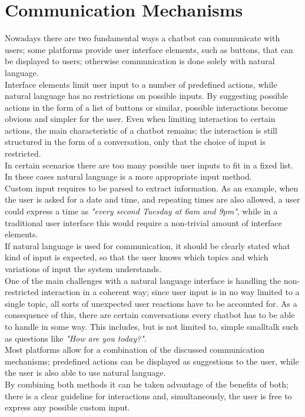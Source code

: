 \section{Communication Mechanisms}
\label{communication}


Nowadays there are two fundamental ways a chatbot can communicate with users;
some platforms provide user interface elements, such as buttons, that can be displayed to users;
otherwise communication is done solely with natural language.
\\

Interface elements limit user input to a number of predefined actions,
while natural language has no restrictions on possible inputs.
By suggesting possible actions in the form of a list of buttons or similar,
possible interactions become obvious and simpler for the user.
Even when limiting interaction to certain actions,
the main characteristic of a chatbot remains;
the interaction is still structured in the form of a conversation,
only that the choice of input is restricted.
\\

In certain scenarios there are too many possible user inputs to fit in a fixed list.
In these cases natural language is a more appropriate input method.
\\
Custom input requires to be parsed to extract information.
As an example, when the user is asked for a date and time, and repeating times are also allowed,
a user could express a time as \emph{"every second Tuesday at 6am and 9pm"},
while in a traditional user interface this would require a non-trivial amount of interface elements.
\\

If natural language is used for communication,
it should be clearly stated what kind of input is expected,
so that the user knows which topics and which variations of input the system understands.
\\

One of the main challenges with a natural language interface is handling the non-restricted interaction
in a coherent way;
since user input is in no way limited to a single topic,
all sorts of unexpected user reactions have to be accounted for.
As a consequence of this, there are certain conversations every chatbot has to be able to handle in some way.
This includes, but is not limited to, simple smalltalk such as questions like \emph{"How are you today?"}.
\\

Most platforms allow for a combination of the discussed communication mechanisms;
predefined actions can be displayed as suggestions to the user,
while the user is also able to use natural language.
\\
By combining both methods it can be taken advantage of the benefits of both;
there is a clear guideline for interactions and, simultaneously,
the user is free to express any possible custom input.
